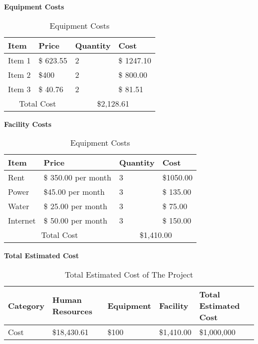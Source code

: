 \begin{table}[H]
    \centering
    \textbf{Equipment Costs}
    \begin{tabular}{||m{}|m{}|m{}|m{}||}
        \hline
        Item & Price & Quantity & Cost\\
        \hline
        Item 1 &  \$ 623.55 & 2 & \$ 1247.10\\ 
        \hline
        Item 2 & \$400 & 2 & \$ 800.00 \\
        \hline
        Item 3 & \$ 40.76 & 2 & \$ 81.51\\ 
        \hline
        \multicolumn{2}{||c|}{Total Cost} & \multicolumn{2}{c||}{\$2,128.61}\\
        \hline
       \end{tabular}
       \caption {Equipment Costs}
       \label{table:4}
\end{table}
\begin{table}[H]
    \centering
    \textbf{Facility Costs}
    \begin{tabular}{||m{}|m{}|m{}|m{}||}
        \hline
        Item & Price & Quantity & Cost\\
        \hline
        Rent &  \$ 350.00 per month & 3 & \$1050.00\\ 
        \hline
        Power & \$45.00 per month & 3 & \$ 135.00 \\
        \hline
        Water & \$ 25.00 per month & 3 & \$ 75.00\\ 
        \hline
        Internet& \$ 50.00 per month & 3 & \$ 150.00\\ 
        \hline
        \multicolumn{2}{||c|}{Total Cost} & \multicolumn{2}{c||}{\$1,410.00}\\
        \hline
       \end{tabular}
       \caption {Equipment Costs}
       \label{table:5}
\end{table}
\begin{table}[H]
    \centering
    \textbf{Total Estimated Cost}
    \begin{tabular}{||m{}|m{}|m{}|m{}|m{}||}
        \hline
        Category & Human Resources & Equipment & Facility & Total Estimated Cost\\
        \hline
        Cost & \$18,430.61 & \$100 & \$1,410.00 & \$1,000,000\\
        \hline
    \end{tabular}
    \caption {Total Estimated Cost of The Project}
       \label{table:6}
\end{table}
